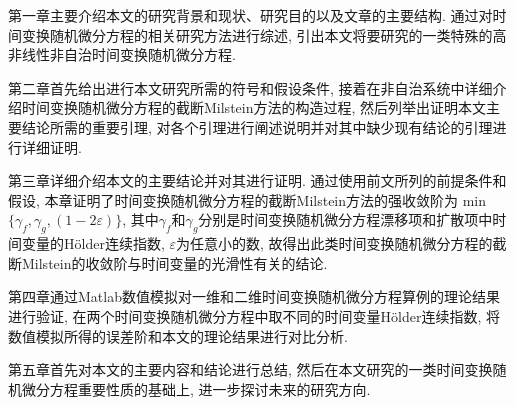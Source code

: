 第一章主要介绍本文的研究背景和现状、研究目的以及文章的主要结构. 通过对时间变换随机微分方程的相关研究方法进行综述, 引出本文将要研究的一类特殊的高非线性非自治时间变换随机微分方程.

第二章首先给出进行本文研究所需的符号和假设条件, 接着在非自治系统中详细介绍时间变换随机微分方程的截断Milstein方法的构造过程, 然后列举出证明本文主要结论所需的重要引理, 对各个引理进行阐述说明并对其中缺少现有结论的引理进行详细证明.

第三章详细介绍本文的主要结论并对其进行证明. 通过使用前文所列的前提条件和假设, 本章证明了时间变换随机微分方程的截断Milstein方法的强收敛阶为
min$\{\gamma_f,\gamma_g,(1-2\varepsilon)\}$, 其中$\gamma_f$和$\gamma_g$分别是时间变换随机微分方程漂移项和扩散项中时间变量的H{\"o}lder连续指数, $\varepsilon$为任意小的数, 故得出此类时间变换随机微分方程的截断Milstein的收敛阶与时间变量的光滑性有关的结论.

第四章通过Matlab数值模拟对一维和二维时间变换随机微分方程算例的理论结果进行验证, 在两个时间变换随机微分方程中取不同的时间变量H{\"o}lder连续指数, 将数值模拟所得的误差阶和本文的理论结果进行对比分析.

第五章首先对本文的主要内容和结论进行总结, 然后在本文研究的一类时间变换随机微分方程重要性质的基础上, 进一步探讨未来的研究方向. 
